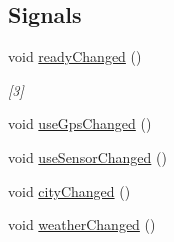 \subsection*{Signals}
\begin{DoxyCompactItemize}
\item 
void \hyperlink{class_app_model_a574c2bd6f5c92ac9268107f8399989cb}{ready\+Changed} ()
\begin{DoxyCompactList}\small\item\em \mbox{[}3\mbox{]} \end{DoxyCompactList}\item 
void \hyperlink{class_app_model_af0007ee4da862433868baa5fdb31a3fe}{use\+Gps\+Changed} ()
\item 
void \hyperlink{class_app_model_a947db57e8c272bdb2420f3f273cd2e6a}{use\+Sensor\+Changed} ()
\item 
void \hyperlink{class_app_model_aeb28c7a57316aaf6295a943a65f60569}{city\+Changed} ()
\item 
void \hyperlink{class_app_model_a83e61455ed5672333b0db45f3f86417c}{weather\+Changed} ()
\end{DoxyCompactItemize}
